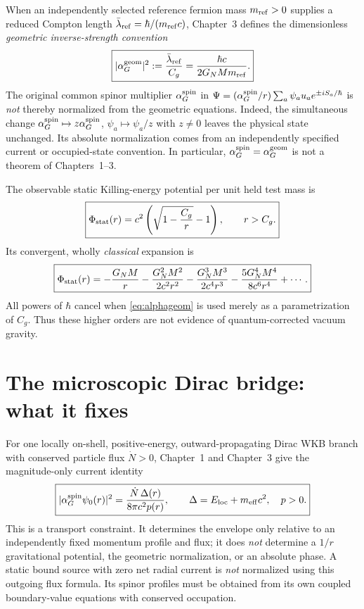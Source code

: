 \documentclass[11pt,a4paper]{article}
\begin{document}
When an independently selected reference fermion mass $m_{\rm ref}>0$
supplies a reduced Compton length $\bar\lambda_{\rm ref}=\hbar/(m_{\rm ref}c)$,
Chapter~3 defines the dimensionless \emph{geometric inverse-strength
convention}
\begin{equation}\label{eq:alphageom}
\boxed{\displaystyle |\alpha_G^{\rm geom}|^2:=\frac{\bar\lambda_{\rm ref}}{C_g}
=\frac{\hbar c}{2G_NMm_{\rm ref}}.}
\end{equation}
The original common spinor multiplier $\alpha_G^{\rm spin}$ in
$\Psi=(\alpha_G^{\rm spin}/r)\sum_a\psi_a u_a e^{\pm iS_a/\hbar}$
is \emph{not} thereby normalized from the geometric equations.
Indeed, the simultaneous change
$\alpha_G^{\rm spin}\mapsto z\alpha_G^{\rm spin}$,
$\psi_a\mapsto\psi_a/z$ with $z\ne0$ leaves the physical state
unchanged. Its absolute normalization comes from an independently
specified current or occupied-state convention. In particular,
$\alpha_G^{\rm spin}=\alpha_G^{\rm geom}$ is not a theorem of
Chapters~1--3.

The observable static Killing-energy potential per unit held test
mass is
\begin{equation}\label{eq:pot}
\boxed{\displaystyle\Phi_{\rm stat}(r)=c^2\left(\sqrt{1-\frac{C_g}{r}}-1\right),
\qquad r>C_g.}
\end{equation}
Its convergent, wholly \emph{classical} expansion is
\begin{equation}\label{eq:classseries}
\boxed{\displaystyle\Phi_{\rm stat}(r)=-\frac{G_NM}{r}
-\frac{G_N^2M^2}{2c^2r^2}
-\frac{G_N^3M^3}{2c^4r^3}
-\frac{5G_N^4M^4}{8c^6r^4}+\cdots .}
\end{equation}
All powers of $\hbar$ cancel when \eqref{eq:alphageom} is used
merely as a parametrization of $C_g$. Thus these higher orders are
not evidence of quantum-corrected vacuum gravity.

\section{The microscopic Dirac bridge: what it fixes}\label{sec:bridge}
For one locally on-shell, positive-energy, outward-propagating Dirac
WKB branch with conserved particle flux $\dot N>0$, Chapter~1 and
Chapter~3 give the magnitude-only current identity
\begin{equation}\label{eq:fluxbridge}
\boxed{\displaystyle |\alpha_G^{\rm spin}\psi_0(r)|^2
=\frac{\dot N\,\Delta(r)}{8\pi c^2p(r)},\qquad
\Delta=E_{\rm loc}+m_{\rm eff}c^2,\quad p>0.}
\end{equation}
This is a transport constraint. It determines the envelope only
relative to an independently fixed momentum profile and flux; it does
\emph{not} determine a $1/r$ gravitational potential, the geometric
normalization, or an absolute phase. A static bound source with
zero net radial current is \emph{not} normalized using this outgoing
flux formula. Its spinor profiles must be obtained from its own
coupled boundary-value equations with conserved occupation.
\end{document}
